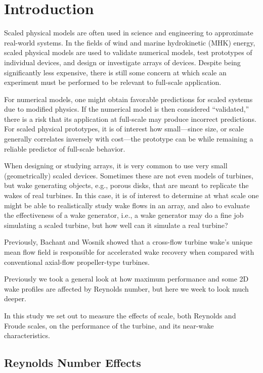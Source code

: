 \documentclass[energies,article,accept,moreauthors,pdftex,12pt,a4paper]{mdpi}
\begin{document}
\listoftodos

\section{Introduction}

Scaled physical models are often used in science and engineering to approximate
real-world systems. In the fields of wind and marine hydrokinetic (MHK) energy,
scaled physical models are used to validate numerical models, test prototypes of
individual devices, and design or investigate arrays of devices. Despite being
significantly less expensive, there is still some concern at which scale an
experiment must be performed to be relevant to full-scale application.

For numerical models, one might obtain favorable predictions for scaled systems
due to modified physics. If the numerical model is then considered
``validated,'' there is a risk that its application at full-scale may produce
incorrect predictions. For scaled physical prototypes, it is of interest how
small---since size, or scale generally correlates inversely with cost---the
prototype can be while remaining a reliable predictor of full-scale behavior.

When designing or studying arrays, it is very common to use very small
(geometrically) scaled devices. Sometimes these are not even models of turbines,
but wake generating objects, e.g., porous disks, that are meant to replicate the
wakes of real turbines. In this case, it is of interest to determine at what
scale one might be able to realistically study wake flows in an array, and also
to evaluate the effectiveness of a wake generator, i.e., a wake generator may do
a fine job simulating a scaled turbine, but how well can it simulate a real
turbine?

Previously, Bachant and Wosnik \cite{Bachant2015-JoT} showed that a cross-flow
turbine wake's unique mean flow field is responsible for accelerated wake
recovery when compared with conventional axial-flow propeller-type turbines.

Previously we took a general look at how maximum performance and some 2D wake
profiles are affected by Reynolds number, but here we week to look much deeper.

In this study we set out to measure the effects of scale, both Reynolds and
Froude scales, on the performance of the turbine, and its near-wake
characteristics.

\subsection{Reynolds Number Effects}
\end{document}
